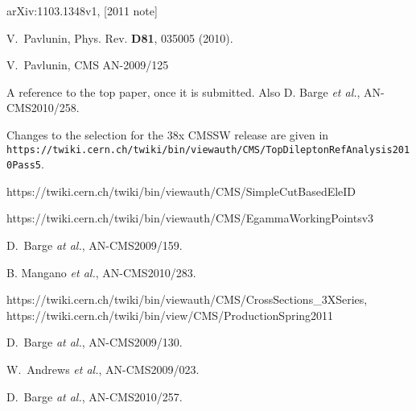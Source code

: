 \begin{thebibliography}{10}

 arXiv:1103.1348v1, [2011 note]

 V.~Pavlunin, Phys. Rev. {\bf D81}, 035005 (2010).
    
 V.~Pavlunin, CMS AN-2009/125

 A reference to the top paper, once it is submitted.  Also
D. Barge {\em et al.}, AN-CMS2010/258.  

 Changes to the selection for the 38x CMSSW release are given in 
{\tt https://twiki.cern.ch/twiki/bin/viewauth/CMS/TopDileptonRefAnalysis2010Pass5}.

 https://twiki.cern.ch/twiki/bin/viewauth/CMS/SimpleCutBasedEleID

 https://twiki.cern.ch/twiki/bin/viewauth/CMS/EgammaWorkingPointsv3

 D.~Barge {\em at al.}, AN-CMS2009/159.

 B. Mangano {\em et al.}, %
AN-CMS2010/283.

 https://twiki.cern.ch/twiki/bin/viewauth/CMS/CrossSections\_3XSeries, 
https://twiki.cern.ch/twiki/bin/view/CMS/ProductionSpring2011


 D.~Barge {\em at al.}, AN-CMS2009/130.

 W.~Andrews {\em et al.}, AN-CMS2009/023.

 D.~Barge {\em at al.}, AN-CMS2010/257.

\end{thebibliography}
